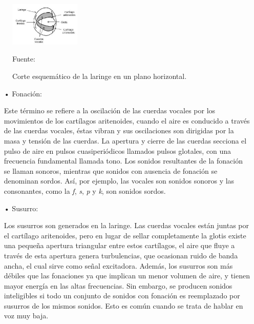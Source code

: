 \begin{enumerate}
\begin{figure}[ht]
\begin{center}
\includegraphics[width=0.3\textwidth]{Imagenes/Cap2/image002}
\end{center}
\begin{center}
\vskip -0.5cm
\caption{\small{Corte esquemático de la laringe en un plano horizontal.}}
\label{fig:figura2.2}
{\small{Fuente: \cite{owens}}}
\end{center}
\end{figure}

\begin{enumerate}
\item[•]Fonación:
\par
Este término se refiere a la oscilación de las cuerdas vocales por los movimientos de los cartílagos aritenoides, cuando el aire es conducido a través de las cuerdas vocales, éstas vibran y sus oscilaciones son dirigidas por la masa y tensión de las cuerdas. La apertura y cierre de las cuerdas secciona el pulso de aire en pulsos cuasiperiódicos llamados pulsos glotales, con una frecuencia fundamental llamada tono. Los sonidos resultantes de la fonación se llaman sonoros, mientras que sonidos con ausencia de fonación se denominan sordos. Así, por ejemplo, las vocales son sonidos sonoros y las consonantes, como la \textit{f}, \textit{s}, \textit{p} y \textit{k}, son sonidos sordos.

\item[•]Susurro:
\par
Los susurros son generados en la laringe. Las cuerdas vocales están juntas por el cartílago aritenoides, pero en lugar de sellar completamente la glotis existe una pequeña apertura triangular entre estos cartílagos, el aire que fluye a través de esta apertura genera turbulencias, que ocasionan ruido de banda ancha, el cual sirve como señal excitadora. Además, los susurros son más débiles que las fonaciones ya que implican un menor volumen de aire, y tienen mayor energía en las altas frecuencias. Sin embargo, se producen sonidos inteligibles si todo un conjunto de sonidos con fonación es reemplazado por susurros de los mismos sonidos. Esto es común cuando se trata de hablar en voz muy baja.


\end{enumerate}
\end{enumerate}
